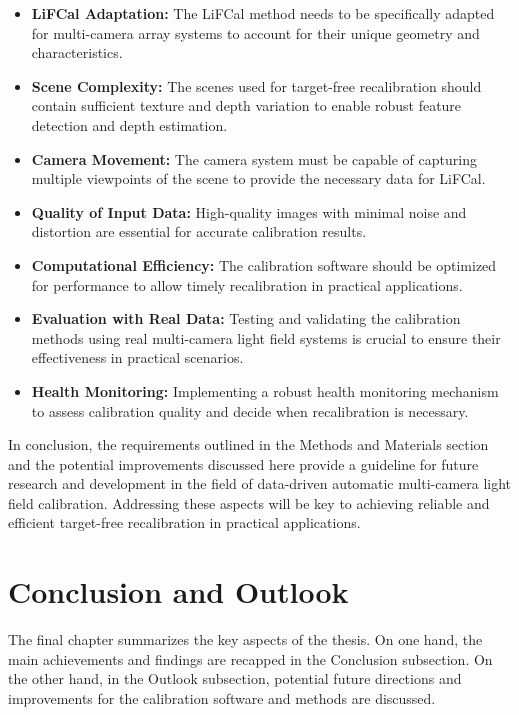 \documentclass[12pt]{scrartcl}
\begin{document}
\begin{itemize}
    \item \textbf{LiFCal Adaptation:} The LiFCal method needs to be specifically adapted for multi-camera array systems to account for their unique geometry and characteristics.
    \item \textbf{Scene Complexity:} The scenes used for target-free recalibration should contain sufficient texture and depth variation to enable robust feature detection and depth estimation.
    \item \textbf{Camera Movement:} The camera system must be capable of capturing multiple viewpoints of the scene to provide the necessary data for LiFCal.
    \item \textbf{Quality of Input Data:} High-quality images with minimal noise and distortion are essential for accurate calibration results.
    \item \textbf{Computational Efficiency:} The calibration software should be optimized for performance to allow timely recalibration in practical applications.
    \item \textbf{Evaluation with Real Data:} Testing and validating the calibration methods using real multi-camera light field systems is crucial to ensure their effectiveness in practical scenarios.
    \item \textbf{Health Monitoring:} Implementing a robust health monitoring mechanism to assess calibration quality and decide when recalibration is necessary.
\end{itemize}

In conclusion, the requirements outlined in the Methods and Materials section and the potential improvements discussed here provide a guideline for future research and development in the field of data-driven automatic multi-camera light field calibration. Addressing these aspects will be key to achieving reliable and efficient target-free recalibration in practical applications.

\clearpage

\section{Conclusion and Outlook} \label{Chapter 6}

The final chapter summarizes the key aspects of the thesis. On one hand, the main achievements and findings are recapped in the Conclusion subsection. On the other hand, in the Outlook subsection, potential future directions and improvements for the calibration software and methods are discussed.
\end{document}
